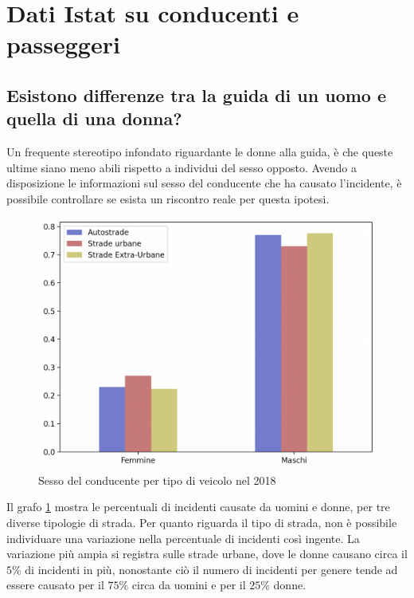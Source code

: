 \documentclass[a4paper,12pt]{report}
\begin{document}
\section{Dati Istat su conducenti e passeggeri}

\subsection{Esistono differenze tra la guida di un uomo e quella di una donna?}

Un frequente stereotipo infondato riguardante le donne alla guida, è che queste 
ultime siano meno abili rispetto a individui del sesso opposto. 
Avendo a disposizione le informazioni sul sesso del conducente che ha causato l'incidente, 
è possibile controllare se esista un riscontro reale per questa ipotesi.

\begin{figure}
    \includegraphics[width=\linewidth]{../src/incidenti/incidenti_senza_coords/tipo_veicoli/uomo-donna.png}
    \caption{Sesso del conducente per tipo di veicolo nel 2018}
    \label{fig:differenza-uomo-donna}
\end{figure}

Il grafo \ref{fig:differenza-uomo-donna} mostra le percentuali di incidenti causate 
da uomini e donne, per tre diverse tipologie di strada. 
Per quanto riguarda il tipo di strada, non è possibile individuare una 
variazione nella percentuale di incidenti così ingente. 
La variazione più ampia si registra sulle strade urbane, dove le donne causano circa il 
$5$\% di incidenti in più, nonostante ciò il numero 
di incidenti per genere tende ad essere causato per il $75$\% circa da uomini e 
per il $25$\% donne.
\end{document}
